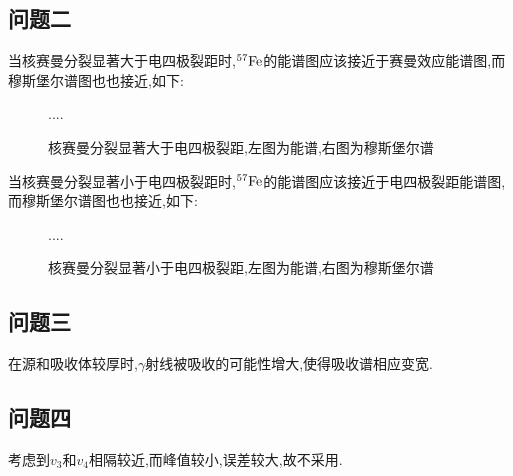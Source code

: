 \documentclass[aps,pre,12pt,preprint,onecolumn,showpacs,showkeys]{revtex4-1}
\begin{document}
\subsection{问题二}
当核赛曼分裂显著大于电四极裂距时,$^{57}\rm{Fe}$的能谱图应该接近于赛曼效应能谱图,而穆斯堡尔谱图也也接近,如下:
\begin{figure}[htbp]
    \centering
    ....
    \caption{核赛曼分裂显著大于电四极裂距,左图为能谱,右图为穆斯堡尔谱}
    \label{fig:4}
\end{figure}
当核赛曼分裂显著小于电四极裂距时,$^{57}\rm{Fe}$的能谱图应该接近于电四极裂距能谱图,而穆斯堡尔谱图也也接近,如下:
\begin{figure}[htbp]
    \centering
    ....
    \caption{核赛曼分裂显著小于电四极裂距,左图为能谱,右图为穆斯堡尔谱}
    \label{fig:5}
\end{figure}
\subsection{问题三}
在源和吸收体较厚时,$\gamma$射线被吸收的可能性增大,使得吸收谱相应变宽.
\subsection{问题四}
考虑到$v_3$和$v_4$相隔较近,而峰值较小,误差较大,故不采用.
\end{document}
